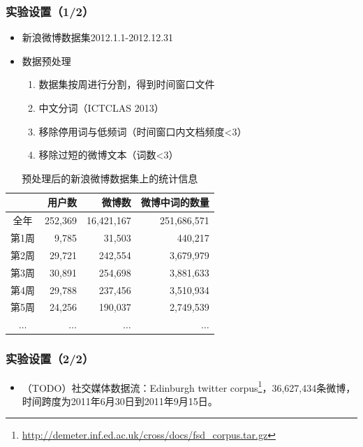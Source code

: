 \begin{frame}
\frametitle{实验设置（1/2）}
\begin{itemize}
	\item 新浪微博数据集2012.1.1-2012.12.31
	\item 数据预处理
	\begin{enumerate}
		\item 数据集按周进行分割，得到时间窗口文件
		\item 中文分词（ICTCLAS 2013）
		\item 移除停用词与低频词（时间窗口内文档频度<3）
		\item 移除过短的微博文本（词数<3）
	\end{enumerate}
\end{itemize}

\begin{table}
\setlength{\abovecaptionskip}{0.cm}
\setlength{\belowcaptionskip}{0.cm}
\scriptsize
\centering
\caption{预处理后的新浪微博数据集上的统计信息}
\begin{tabular}{|c|r|r|r|} \hline
 & 用户数 & 微博数 & 微博中词的数量 \\ \hline
全年& 252,369 & 16,421,167 & 251,686,571\\ \hline
第1周 & 9,785 & 31,503 & 440,217 \\ \hline
第2周 & 29,721 & 242,554 & 3,679,979 \\ \hline
第3周 & 30,891 & 254,698 & 3,881,633 \\ \hline
第4周 & 29,788 & 237,456 & 3,510,934 \\ \hline
第5周 & 24,256 & 190,037 & 2,749,539 \\ \hline
\(\dots\) & \(\dots\) & \(\dots\) & \(\dots\) \\ \hline
\end{tabular}
\label{statisticsOfDataset}
\end{table}
\end{frame}

\begin{frame}
\frametitle{实验设置（2/2）}

\begin{itemize}
	\item （TODO）社交媒体数据流：Edinburgh twitter corpus\footnote{\tiny{\url{http://demeter.inf.ed.ac.uk/cross/docs/fsd_corpus.tar.gz}}}，36,627,434条微博，时间跨度为2011年6月30日到2011年9月15日。
\end{itemize} 
\end{frame}

